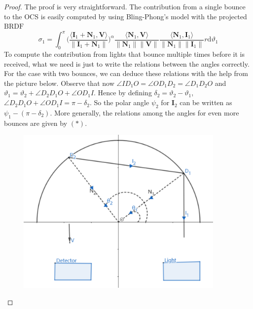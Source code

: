 \documentclass[11pt]{amsart}
\newcommand{\BRDF}{\mathrm{BRDF}}
\newcommand{\ip}[2]{\langle {#1}, {#2} \rangle}
\theoremstyle{definition}
\begin{document}
\begin{proof}
The proof is very straightforward. The contribution from a single bounce to the OCS is easily computed by using Bling-Phong's model with the projected $\BRDF$
$$\sigma_1 =\int_{0}^{\pi}\Bigg(\frac{\ip{\mathbf{I}_1+\mathbf{N}_1}{\mathbf{V}}}{\|\mathbf{I}_1+\mathbf{N}_1\|}\Bigg)^\alpha\frac{\ip{\mathbf{N}_1}{\mathbf{V}}}{\|\mathbf{N}_1\| \|\mathbf{V}\|}\frac{\ip{\mathbf{N}_1}{\mathbf{I}_1}}{\|\mathbf{N}_1\| \|\mathbf{I}_1\|} r\mathrm{d}\vartheta_1$$
To compute the contribution from lights that bounce multiple times before it is received, what we need is just to write the relations between the angles correctly. For the case with two bounces, we can deduce these relations with the help from the picture below. Observe that now
$\angle{ID_1O}=\angle{OD_1D_2}=\angle{D_1D_2O}$ and $\vartheta_1=\vartheta_2+\angle{D_2D_1O}+\angle{OD_1I}$. Hence by defining $\delta_2=\vartheta_2-\vartheta_1$, $\angle{D_2D_1O}+\angle{OD_1I}=\pi-\delta_2$. So the polar angle $\psi_2$ for $\mathbf{I}_2$ can be written as $\psi_1-(\pi-\delta_2)$.  More generally,  the relations among the angles for even more bounces are given by  $(*)$.
\begin{figure}[H]
  \includegraphics[width=4in]{./figs/multipath_edit.pdf}
  \label{fig:reflection}
\end{figure}


\end{proof}
\end{document}

